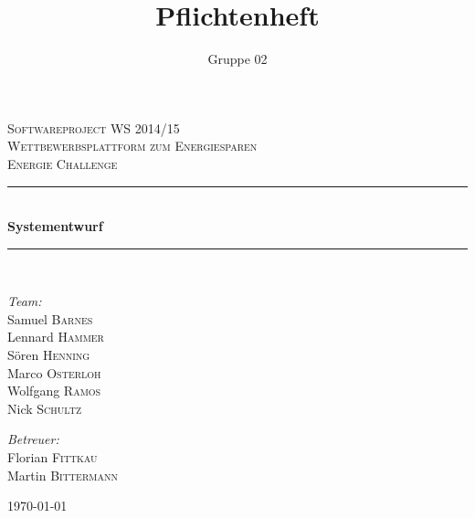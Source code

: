 \documentclass[10pt,a4paper]{article}
\author{Gruppe 02}
\title{Pflichtenheft}
\begin{document}
\begin{titlepage}

\begin{center}



\textsc{\LARGE Softwareproject WS 2014/15}\\[1.5cm]

\textsc{\Large Wettbewerbsplattform zum Energiesparen\\[1cm]Energie Challenge}\\[0.5cm]


\newcommand{\HRule}{\rule{\linewidth}{0.5mm}}
\HRule \\[0.4cm]
{ \huge \bfseries Systementwurf}\\[0.4cm]

\HRule \\[1.5cm]

\begin{minipage}{0.4\textwidth}
\begin{flushleft} \large
\emph{Team:}\\
Samuel \textsc{Barnes}\\
Lennard \textsc{Hammer}\\
S\"oren \textsc{Henning}\\
Marco \textsc{Osterloh}\\
Wolfgang \textsc{Ramos}\\
Nick \textsc{Schultz}
\end{flushleft}
\end{minipage}
\hfill
\begin{minipage}{0.4\textwidth}
\begin{flushright} \large
\emph{Betreuer:} \\
Florian \textsc{Fittkau}\\
Martin \textsc{Bittermann}
\end{flushright}
\end{minipage}

\vfill

{\large \today}

\end{center}

\end{titlepage}
\newpage

\tableofcontents
\newpage







\end{document}
